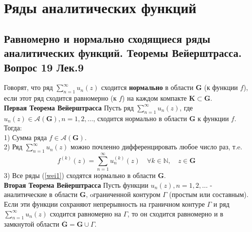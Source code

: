 \documentclass{article}
\begin{document}
\section{Ряды аналитических функций}
\subsection{Равномерно и нормально сходящиеся ряды аналитических функций. Теоремы Вейерштрасса. Вопрос 19 Лек.9}
	Говорят, что ряд $ \sum_{n=1}^{\infty} u_{n}(z) $ сходится \textbf{нормально} в области $\mathbf{G}$ (к функции $f$), если этот ряд сходится равномерно (к $ f  $) на каждом компакте $\mathbf{K} \subset \mathbf{G}$.\\
	\textbf{Первая Теорема Вейерштрасса} Пусть ряд $ \sum_{n=1}^{\infty} u_{n}(z)$, где $ u_{n}(z) \in \mathcal{A}(\mathbf{G}), n=1,2, \ldots$, сходится нормально
	в области $\mathbf{G}$ к функции  $f$. Тогда:\\
	1) Сумма ряда $ f \in \mathcal{A}(\mathbf{G}) $.\\
	2) Ряд $ \sum_{n=1}^{\infty} u_{n}(z) $ можно почленно дифференцировать любое число раз, т.e.
	\begin{equation}
	\label{wei1}
	f^{(k)}(z)=\sum_{n=1}^{\infty} u_{n}^{(k)}(z) \quad \forall k \in \mathbb{N}, \quad z \in \mathbf{G}
	\end{equation}
	3) Все ряды (\ref{wei1}) сходятся нормально в области $\mathbf{G}$.\\
	\textbf{Вторая Теорема Вейерштрасса} Пусть функции $ u_{n}(z), n=1,2, \ldots$ - аналитические в области $ \mathbf{G} $, oграниченной контуром $\Gamma$ (простым или составным). Если эти функции сохраняют непрерывность на граничном контуре $\Gamma$ и ряд $ \sum_{n=1}^{\infty} u_{n}(z) $ сходится равномерно на $\Gamma$, то он сходится равномерно и в замкнутой области $ \overline{\mathbf{G}}=\mathbf{G} \cup \Gamma$.\\ 
\end{document}
